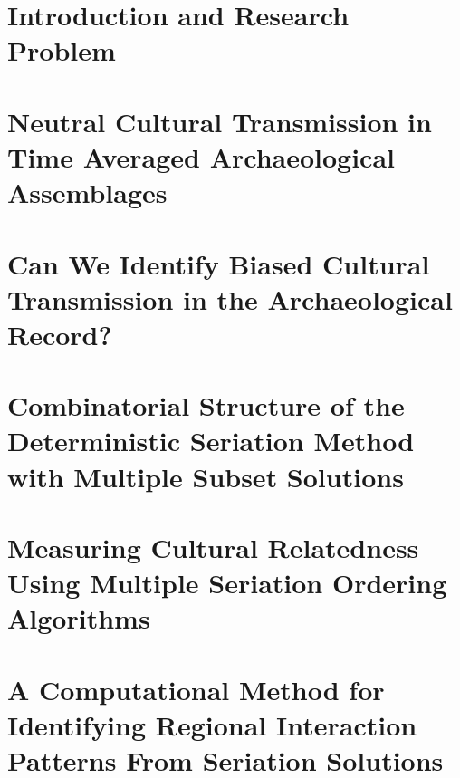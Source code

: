 \documentclass[letterpaper,12pt,final,openright,twoside]{memoir}
\date{\yearonly\today}
\begin{document}

\frontmatter %
\small




\mainmatter %
\normalsize
\acresetall    %

\DoubleSpacing

\chapter{Introduction and Research Problem}
\label{chap:intro}



\chapter{Neutral Cultural Transmission in Time Averaged Archaeological Assemblages}
\label{chap:timeaveraging-paper}


\chapter{Can We Identify Biased Cultural Transmission in the Archaeological Record?}
\label{chap:ctmixtures-paper}


\chapter{Combinatorial Structure of the Deterministic Seriation Method with Multiple Subset Solutions}
\label{chap:seriationcombinatorics-paper}


\chapter{Measuring Cultural Relatedness Using Multiple Seriation Ordering Algorithms}
\label{chap:multipleseriation-paper}


\chapter{A Computational Method for Identifying Regional Interaction Patterns From Seriation Solutions}
\label{chap:computational-metapopulation}

\end{document}
